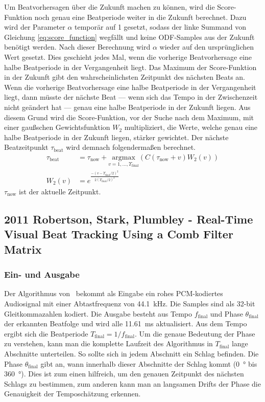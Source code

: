 {{{			%
			Um Beatvorhersagen über die Zukunft machen zu können,
				wird die Score-Funktion noch genau eine Beatperiode weiter in die Zukunft berechnet.
			Dazu wird der Parameter $\alpha$ temporär auf \num{1} gesetzt,
				sodass der linke Summand von Gleichung \eqref{eq:score_function} wegfällt
				und keine \ac{ODF}-Samples aus der Zukunft benötigt werden.
			Nach dieser Berechnung wird $\alpha$ wieder auf den ursprünglichen Wert gesetzt.
			Dies geschieht jedes Mal,
				wenn die vorherige Beatvorhersage eine halbe Beatperiode in der Vergangenheit liegt.
			Das Maximum der Score-Funktion in der Zukunft gibt den wahrscheinlichsten Zeitpunkt des nächsten Beats an.
			Wenn die vorherige Beatvorhersage eine halbe Beatperiode in der Vergangenheit liegt,
				dann müsste der nächste Beat
				--- wenn sich das Tempo in der Zwischenzeit nicht geändert hat ---
				genau eine halbe Beatperiode in der Zukunft liegen.
			Aus diesem Grund wird die Score-Funktion,
				vor der Suche nach dem Maximum,
				mit einer gau{\ss}schen Gewichtsfunktion $W_2$ multipliziert,
				die Werte, welche genau eine halbe Beatperiode in der Zukunft liegen,
				stärker gewichtet.
			Der nächste Beatzeitpunkt $\tau_\text{beat}$ wird demnach folgenderma{\ss}en berechnet.
			\begin{align}
				\tau_\text{beat} &= \tau_\text{now} + \underset{v = 1, ..., \Upsilon_\text{final}}{\text{argmax}}(C(\tau_\text{now} + v)W_2(v)) \\
				W_2(v) &= e^{\frac{-(v - \Upsilon_\text{final} / 2)^2}{2(\Upsilon_\text{final} / 2)^2}}
			\end{align}
			$\tau_\text{now}$ ist der aktuelle Zeitpunkt.
		}
	}

	\subsection{2011 Robertson, Stark, Plumbley - Real-Time Visual Beat Tracking Using a Comb Filter Matrix}
	{
		\subsubsection*{Ein- und Ausgabe}
		{
			Der Algorithmus von~\cite{2011_PlRoSt} bekommt als Eingabe ein rohes \acs{PCM}-kodiertes Audiosignal mit einer Abtastfrequenz von \SI{44.1}{\kilo\hertz}.
			Die Samples sind als 32-bit Gleitkommazahlen kodiert.
			Die Ausgabe besteht aus Tempo $f_\text{final}$ und Phase $\theta_\text{final}$ der erkannten Beatfolge
				und wird alle \SI{11.61}{\milli\second} aktualisiert.
			Aus dem Tempo ergibt sich die Beatperiode $T_\text{final} = 1 / f_\text{final}$.
			Um die genaue Bedeutung der Phase zu verstehen,
				kann man die komplette Laufzeit des Algorithmus in $T_\text{final}$ lange Abschnitte unterteilen.
			So sollte sich in jedem Abschnitt ein Schlag befinden.
			Die Phase $\theta_\text{final}$ gibt an,
				wann innerhalb dieser Abschnitte der Schlag kommt (\SI{0}{\degree} bis \SI{360}{\degree}).
			Dies ist zum einen hilfreich,
				um den genauen Zeitpunkt des nächsten Schlags zu bestimmen,
				zum anderen kann man an langsamen Drifts der Phase die Genauigkeit der Temposchätzung erkennen.
		}

}}
